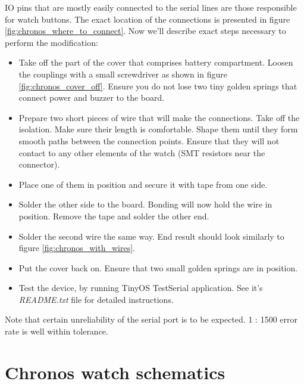 IO pins that are mostly easily connected to the serial lines are those
responsible for watch buttons. The exact location of the connections
is presented in figure \ref{fig:chronos_where_to_connect}.
Now we'll describe exact steps necessary to perform the modification:
\begin{itemize}
  \item Take off the  part of the cover that comprises battery compartment.
    Loosen the couplings with a small screwdriver as shown in figure
    \ref{fig:chronos_cover_off}. Ensure you do not lose two tiny
    golden springs that connect power and buzzer to the board.
  \item Prepare two short pieces of wire that will make the
    connections. Take off the isolation. Make sure their length is
    comfortable. Shape them until they form smooth paths between the
    connection points. Ensure that they will not contact to any other
    elements of the watch (SMT resistors near the connector).
  \item Place one of them in position and secure it with tape
    from one side.
  \item Solder the other side to the board. Bonding will now hold the
    wire in position. Remove the tape and solder the other end.
  \item Solder the second wire the same way. End result should
    look similarly to figure \ref{fig:chronos_with_wires}.
  \item Put the cover back on. Ensure that two small golden springs
    are in position.
  \item Test the device, by running TinyOS TestSerial application. See
    it's \emph{README.txt} file for detailed instructions.
\end{itemize}

Note that certain unreliability of the serial port is to be expected.
1 : 1500 error rate is well within tolerance.


\appendix
\chapter{Chronos watch schematics}
\label{appendix:watch_schematics}

